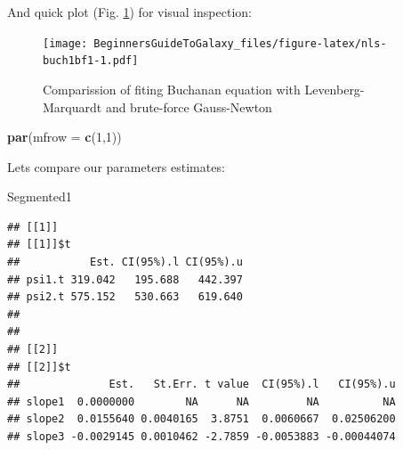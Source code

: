 \documentclass[]{book}
\newenvironment{Shaded}{\begin{snugshade}}{\end{snugshade}}
\newcommand{\KeywordTok}[1]{\textcolor[rgb]{0.13,0.29,0.53}{\textbf{#1}}}
\newcommand{\DataTypeTok}[1]{\textcolor[rgb]{0.13,0.29,0.53}{#1}}
\newcommand{\DecValTok}[1]{\textcolor[rgb]{0.00,0.00,0.81}{#1}}
\newcommand{\OperatorTok}[1]{\textcolor[rgb]{0.81,0.36,0.00}{\textbf{#1}}}
\newcommand{\NormalTok}[1]{#1}
\theoremstyle{definition}
\theoremstyle{definition}
\theoremstyle{definition}
\theoremstyle{remark}
\begin{document}
And quick plot (Fig. \ref{fig:nls-buch1bf1}) for visual inspection:

\begin{Shaded}
\end{Shaded}

\begin{figure}
\centering
\texttt{[image: BeginnersGuideToGalaxy\_files/figure-latex/nls-buch1bf1-1.pdf]}
\caption{\label{fig:nls-buch1bf1}Comparission of fiting Buchanan equation
with Levenberg-Marquardt and brute-force Gauss-Newton}
\end{figure}

\begin{Shaded}
\begin{Highlighting}[]
\KeywordTok{par}\NormalTok{(}\DataTypeTok{mfrow =} \KeywordTok{c}\NormalTok{(}\DecValTok{1}\NormalTok{,}\DecValTok{1}\NormalTok{))}
\end{Highlighting}
\end{Shaded}

Lets compare our parameters estimates:

\begin{Shaded}
\begin{Highlighting}[]
\NormalTok{Segmented1}
\end{Highlighting}
\end{Shaded}

\begin{verbatim}
## [[1]]
## [[1]]$t
##           Est. CI(95%).l CI(95%).u
## psi1.t 319.042   195.688   442.397
## psi2.t 575.152   530.663   619.640
## 
## 
## [[2]]
## [[2]]$t
##              Est.   St.Err. t value  CI(95%).l   CI(95%).u
## slope1  0.0000000        NA      NA         NA          NA
## slope2  0.0155640 0.0040165  3.8751  0.0060667  0.02506200
## slope3 -0.0029145 0.0010462 -2.7859 -0.0053883 -0.00044074
\end{verbatim}
\end{document}
